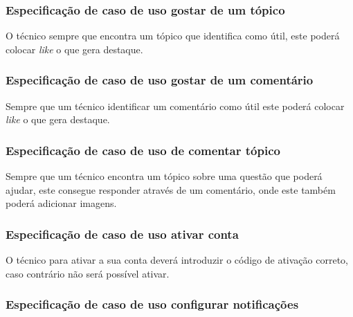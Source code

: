 

\newpage

\subsubsection{Especificação de caso de uso gostar de um tópico}

O técnico sempre que encontra um tópico que identifica como útil, este poderá colocar \textit{like} o que gera destaque.




\subsubsection{Especificação de caso de uso gostar de um comentário}

Sempre que um técnico identificar um comentário como útil este poderá colocar \textit{like} o que gera destaque.



\newpage

\subsubsection{Especificação de caso de uso de comentar tópico}

Sempre que um técnico encontra um tópico sobre uma questão que poderá ajudar, este consegue responder através de um comentário, onde este também poderá adicionar imagens.



\newpage

\subsubsection{Especificação de caso de uso ativar conta}

O técnico para ativar a sua conta deverá introduzir o código de ativação correto, caso contrário não será possível ativar.



\newpage

\subsubsection{Especificação de caso de uso configurar notificações}

